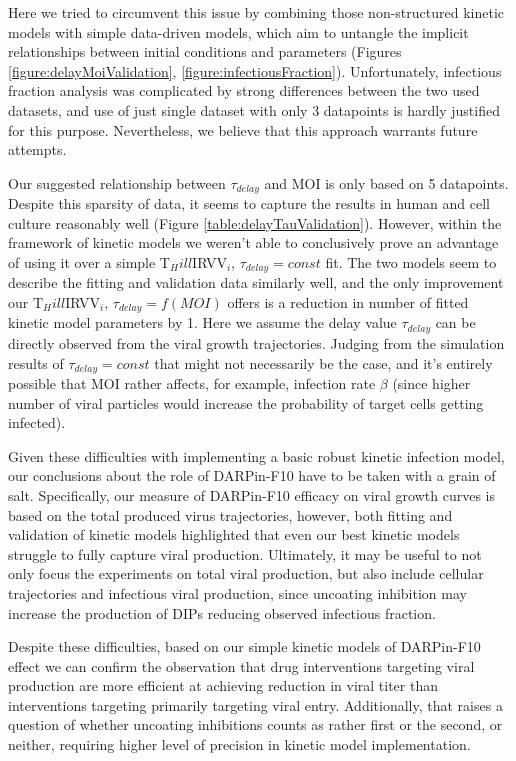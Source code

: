 Here we tried to circumvent this issue by combining those non-structured kinetic models with simple data-driven models, which aim to untangle the implicit relationships between initial conditions and parameters (Figures \ref{figure:delayMoiValidation}, \ref{figure:infectiousFraction}). Unfortunately, infectious fraction analysis was complicated by strong differences between the two used datasets, and use of just single dataset with only 3 datapoints is hardly justified for this purpose. Nevertheless, we believe that this approach warrants future attempts.

Our suggested relationship between $\tau_{delay}$ and MOI is  only based on 5 datapoints. Despite this sparsity of data, it seems to capture the results in human and cell culture reasonably well (Figure \ref{table:delayTauValidation}). However, within the framework of kinetic models we weren't able to conclusively prove an advantage of using it over a simple T$_Hill$IRVV$_i$, $\tau_{delay} = const$ fit. The two models seem to describe the fitting and validation data similarly well, and the only improvement our T$_Hill$IRVV$_i$, $\tau_{delay} = f(MOI)$ offers is a reduction in number of fitted kinetic model parameters by 1. Here we assume the delay value $\tau_{delay}$ can be directly observed from the viral growth trajectories. Judging from the simulation results of $\tau_{delay} = const$ that might not necessarily be the case, and it's entirely possible that MOI rather affects, for example, infection rate $\beta$ (since higher number of viral particles would increase the probability of target cells getting infected). 

Given these difficulties with implementing a basic robust kinetic infection model, our conclusions about the role of DARPin-F10 have to be taken with a grain of salt. Specifically, our measure of DARPin-F10 efficacy on viral growth curves is based on the total produced virus trajectories, however, both fitting and validation of kinetic models highlighted that even our best kinetic models struggle to fully capture viral production. Ultimately, it may be useful to not only focus the experiments on total viral production, but also include cellular trajectories and infectious viral production, since uncoating inhibition may increase the production of DIPs reducing observed infectious fraction.

Despite these difficulties, based on our simple kinetic models of DARPin-F10 effect we can confirm the observation \cite{heldt2013multiscale} that drug interventions targeting viral production are more efficient at achieving reduction in viral titer than interventions targeting primarily targeting viral entry. Additionally, that raises a question of whether uncoating inhibitions counts as rather first or the second, or neither, requiring higher level of precision in kinetic model implementation.